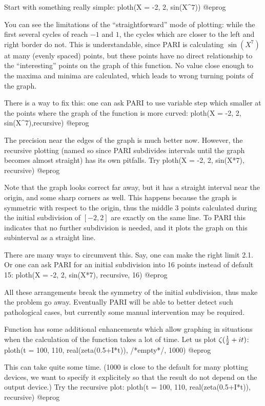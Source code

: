 Start with something really simple:
\bprog
ploth(X = -2, 2, sin(X^7))
@eprog

You can see the limitations of the ``straightforward'' mode of plotting:
while the first several cycles of  reach $-1$ and $1$, the cycles
which are closer to the left and right border do not. This is understandable,
since PARI is calculating $\sin(X^7)$ at many (evenly spaced) points, but
these points have no direct relationship to the ``interesting'' points on
the graph of this function.  No value close enough to the maxima and minima
are calculated, which leads to wrong turning points of the graph.

There is a way to fix this: one can ask PARI to use variable step which
smaller at the points where the graph of the function is more curved:
\bprog
  ploth(X = -2, 2, sin(X^7),recursive)
@eprog

\noindent The precision near the edges of the graph is much better now.
However, the recursive plotting (named so since PARI subdivides intervals
until the graph becomes almost straight) has its own pitfalls.  Try
\bprog
  ploth(X = -2, 2, sin(X*7), recursive)
@eprog

\noindent Note that the graph looks correct far away, but it has a straight
interval near the origin, and some sharp corners as well.  This happens
because the graph is symmetric with respect to the origin, thus the middle 3
points calculated during the initial subdivision of $[-2,2]$ are exactly on
the same line.  To PARI this indicates that no further subdivision is needed,
and it plots the graph on this subinterval as a straight line.

There are many ways to circumvent this.  Say, one can make the right limit
2.1.  Or one can ask PARI for an initial subdivision into 16 points instead
of default 15:
\bprog
  ploth(X = -2, 2, sin(X*7), recursive, 16)
@eprog

All these arrangements break the symmetry of the initial subdivision, thus
make the problem go away.  Eventually PARI will be able to better detect such
pathological cases, but currently some manual intervention may be required.

Function  has some additional enhancements which allow graphing
in situations when the calculation of the function takes a lot of time.  Let
us plot $\zeta({1\over 2} + it)$:
\bprog
  ploth(t = 100, 110, real(zeta(0.5+I*t)), /*empty*/, 1000)
@eprog

\noindent This can take quite some time.  (1000 is close to the default for
many plotting devices, we want to specify it explicitely so that the result
do not depend on the output device.)  Try the recursive plot:
\bprog
  ploth(t = 100, 110, real(zeta(0.5+I*t)), recursive)
@eprog

